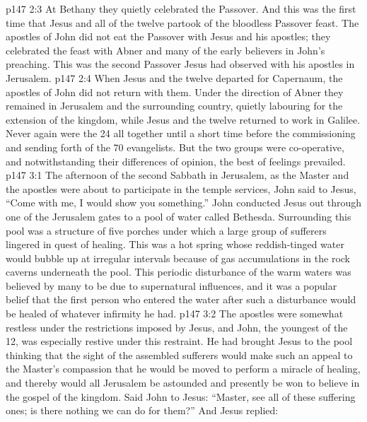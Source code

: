 \vs p147 2:3 At Bethany they quietly celebrated the Passover. And this was the first time that Jesus and all of the twelve partook of the bloodless Passover feast. The apostles of John did not eat the Passover with Jesus and his apostles; they celebrated the feast with Abner and many of the early believers in John’s preaching. This was the second Passover Jesus had observed with his apostles in Jerusalem.
\vs p147 2:4 When Jesus and the twelve departed for Capernaum, the apostles of John did not return with them. Under the direction of Abner they remained in Jerusalem and the surrounding country, quietly labouring for the extension of the kingdom, while Jesus and the twelve returned to work in Galilee. Never again were the 24 all together until a short time before the commissioning and sending forth of the 70 evangelists. But the two groups were co\hyp{}operative, and notwithstanding their differences of opinion, the best of feelings prevailed.
\vs p147 3:1 The afternoon of the second Sabbath in Jerusalem, as the Master and the apostles were about to participate in the temple services, John said to Jesus, “Come with me, I would show you something.” John conducted Jesus out through one of the Jerusalem gates to a pool of water called Bethesda. Surrounding this pool was a structure of five porches under which a large group of sufferers lingered in quest of healing. This was a hot spring whose reddish\hyp{}tinged water would bubble up at irregular intervals because of gas accumulations in the rock caverns underneath the pool. This periodic disturbance of the warm waters was believed by many to be due to supernatural influences, and it was a popular belief that the first person who entered the water after such a disturbance would be healed of whatever infirmity he had.
\vs p147 3:2 The apostles were somewhat restless under the restrictions imposed by Jesus, and John, the youngest of the 12, was especially restive under this restraint. He had brought Jesus to the pool thinking that the sight of the assembled sufferers would make such an appeal to the Master’s compassion that he would be moved to perform a miracle of healing, and thereby would all Jerusalem be astounded and presently be won to believe in the gospel of the kingdom. Said John to Jesus: “Master, see all of these suffering ones; is there nothing we can do for them?” And Jesus replied: 
